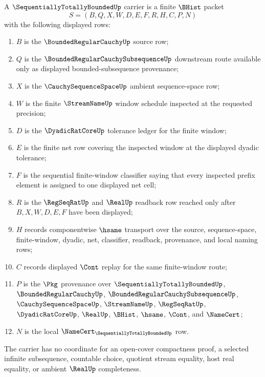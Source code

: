 \begin{definition}
\label{def:sequentially-totally-bounded-carrier}
A $\SequentiallyTotallyBoundedUp$ carrier is a finite $\BHist$ packet
$$
S=(B,Q,X,W,D,E,F,R,H,C,P,N)
$$
with the following displayed rows:
\begin{enumerate}
\item $B$ is the $\BoundedRegularCauchyUp$ source row;
\item $Q$ is the $\BoundedRegularCauchySubsequenceUp$ downstream route available only as displayed bounded-subsequence provenance;
\item $X$ is the $\CauchySequenceSpaceUp$ ambient sequence-space row;
\item $W$ is the finite $\StreamNameUp$ window schedule inspected at the requested precision;
\item $D$ is the $\DyadicRatCoreUp$ tolerance ledger for the finite window;
\item $E$ is the finite net row covering the inspected window at the displayed dyadic tolerance;
\item $F$ is the sequential finite-window classifier saying that every inspected prefix element is assigned to one displayed net cell;
\item $R$ is the $\RegSeqRatUp$ and $\RealUp$ readback row reached only after $B,X,W,D,E,F$ have been displayed;
\item $H$ records componentwise $\hsame$ transport over the source, sequence-space, finite-window, dyadic, net, classifier, readback, provenance, and local naming rows;
\item $C$ records displayed $\Cont$ replay for the same finite-window route;
\item $P$ is the $\Pkg$ provenance over $\SequentiallyTotallyBoundedUp$, $\BoundedRegularCauchyUp$, $\BoundedRegularCauchySubsequenceUp$, $\CauchySequenceSpaceUp$, $\StreamNameUp$, $\RegSeqRatUp$, $\DyadicRatCoreUp$, $\RealUp$, $\BHist$, $\hsame$, $\Cont$, and $\NameCert$;
\item $N$ is the local $\NameCert_{\SequentiallyTotallyBoundedUp}$ row.
\end{enumerate}
The carrier has no coordinate for an open-cover compactness proof, a selected infinite subsequence, countable choice, quotient stream equality, host real equality, or ambient $\RealUp$ completeness.
\end{definition}

